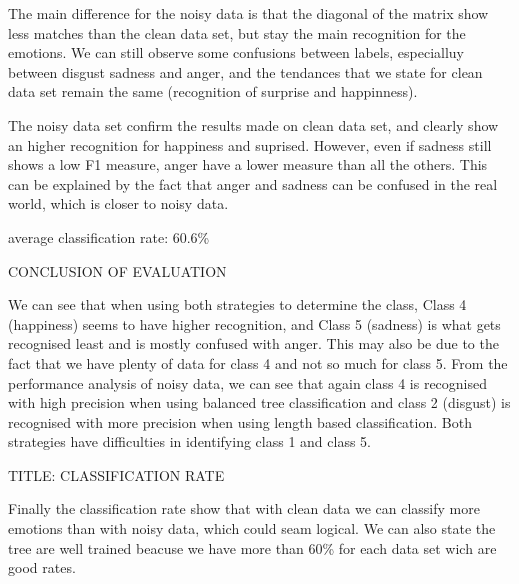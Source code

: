  


The main difference for the noisy data is that the diagonal of the matrix show less matches than the clean data set, but stay the main recognition for the emotions.
We can still observe some confusions between labels, especialluy between disgust sadness and anger, and the tendances that we state for clean data set remain the same (recognition of surprise and happinness).




The noisy data set confirm the results made on clean data set, and clearly show an higher recognition for happiness and suprised. However, even if sadness still shows a low F1 measure, anger have a lower measure than all the others. This can be explained by the fact that anger and sadness can be confused in the real world, which is closer to noisy data. 


average classification rate:
60.6\%


CONCLUSION OF EVALUATION

We can see that when using both strategies to determine the class, Class 4 (happiness) seems to have higher recognition, and Class 5 (sadness) is what gets recognised least and is mostly confused with anger. This may also be due to the fact that we have plenty of data for class 4 and not so much for class 5.
From the performance analysis of noisy data, we can see that again class 4 is recognised with high precision when using balanced tree classification and class 2 (disgust) is recognised with more precision when using length based classification. Both strategies have difficulties in identifying class 1 and class 5.

TITLE: CLASSIFICATION RATE

Finally the classification rate show that with clean data we can classify more emotions than with noisy data, which could seam logical. 
We can also state the tree are well trained beacuse we have more than 60\% for each data set wich are good rates. 




